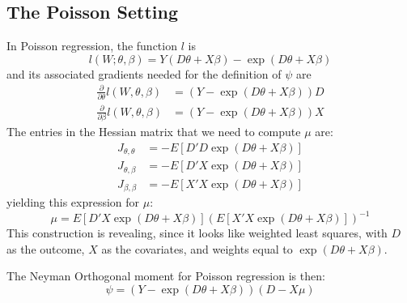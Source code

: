 \documentclass[11pt]{article}
\begin{document}
\subsection{The Poisson Setting}
In Poisson regression, the function $l$ is
\begin{equation*}
	l(W; \theta, \beta) = Y(D\theta + X\beta) - \exp(D\theta + X\beta)
\end{equation*}
and its associated gradients needed for the definition of $\psi$ are
\begin{align*}
	\frac{\partial}{\partial \theta}l(W, \theta, \beta) &= (Y - \exp(D\theta + X\beta)) D \\
	\frac{\partial}{\partial \beta}l(W, \theta, \beta) &= (Y - \exp(D\theta + X\beta)) X
\end{align*}
The entries in the Hessian matrix that we need to compute $\mu$ are:
\begin{align*}
	J_{\theta, \theta} &= -E\left[D'D\exp(D\theta + X\beta)\right] \\
	J_{\theta, \beta} &= -E\left[D'X\exp(D\theta + X\beta)\right] \\
	J_{\beta, \beta} &= -E\left[X'X\exp(D\theta + X\beta)\right]
\end{align*}
yielding this expression for $\mu$:
\begin{equation*}
	\mu = E\left[D'X\exp(D\theta + X\beta)\right]\left(E\left[X'X\exp(D\theta + X\beta)\right]\right)^{-1}
\end{equation*}
This construction is revealing, since it looks like weighted least squares, with $D$ as the outcome, $X$ as the covariates, and weights equal to $\exp(D\theta + X\beta)$.

The Neyman Orthogonal moment for Poisson regression is then:
\begin{equation*}
	\psi = (Y - \exp(D\theta + X\beta))(D - X\mu)
\end{equation*}
\end{document}
